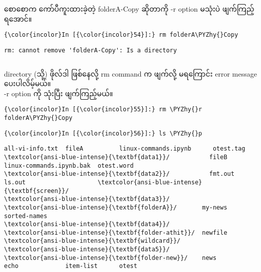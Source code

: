 \documentclass[11pt]{article}
\def\PYZhy{\char`\-}
\begin{document}
    စောစောက ကော်ပီကူးထားခဲ့တဲ့ folderA-Copy ဆိုတာကို -r option မသုံးပဲ
ဖျက်ကြည့်ရအောင်။

    \begin{Verbatim}[commandchars=\\\{\}]
{\color{incolor}In [{\color{incolor}54}]:} rm folderA\PYZhy{}Copy
\end{Verbatim}

    \begin{Verbatim}[commandchars=\\\{\}]
rm: cannot remove 'folderA-Copy': Is a directory

    \end{Verbatim}

    \begin{Verbatim}[commandchars=\\\{\}]

    \end{Verbatim}

    directory (သို့) ဖိုလ်ဒါ ဖြစ်နေလို့ rm command က ဖျက်လို့ မရကြောင်း
error message ပေးပါလိမ့်မယ်။\\
-r option ကို သုံးပြီး ဖျက်ကြည့်မယ်။

    \begin{Verbatim}[commandchars=\\\{\}]
{\color{incolor}In [{\color{incolor}55}]:} rm \PYZhy{}r folderA\PYZhy{}Copy
\end{Verbatim}

    \begin{Verbatim}[commandchars=\\\{\}]
{\color{incolor}In [{\color{incolor}56}]:} ls \PYZhy{}p
\end{Verbatim}

    \begin{Verbatim}[commandchars=\\\{\}]
all-vi-info.txt  fileA          linux-commands.ipynb      otest.tag
\textcolor{ansi-blue-intense}{\textbf{data1}}/           fileB          linux-commands.ipynb.bak  otest.word
\textcolor{ansi-blue-intense}{\textbf{data2}}/           fmt.out        ls.out                    \textcolor{ansi-blue-intense}{\textbf{screen}}/
\textcolor{ansi-blue-intense}{\textbf{data3}}/           \textcolor{ansi-blue-intense}{\textbf{folderA}}/       my-news                   sorted-names
\textcolor{ansi-blue-intense}{\textbf{data4}}/           \textcolor{ansi-blue-intense}{\textbf{folder-athit}}/  newfile                   \textcolor{ansi-blue-intense}{\textbf{wildcard}}/
\textcolor{ansi-blue-intense}{\textbf{data5}}/           \textcolor{ansi-blue-intense}{\textbf{folder-new}}/    news
echo             item-list      otest

    \end{Verbatim}
\end{document}
